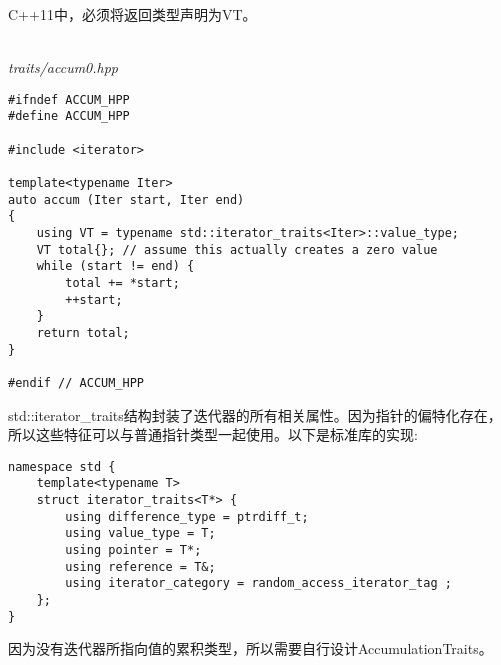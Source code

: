 \begin{tcolorbox}[colback=webgreen!5!white,colframe=webgreen!75!black]
\hspace*{0.75cm}C++11中，必须将返回类型声明为VT。
\end{tcolorbox}

\hspace*{\fill} \\ %
\noindent
\textit{traits/accum0.hpp}
\begin{lstlisting}[style=styleCXX]
#ifndef ACCUM_HPP
#define ACCUM_HPP

#include <iterator>

template<typename Iter>
auto accum (Iter start, Iter end)
{
	using VT = typename std::iterator_traits<Iter>::value_type;
	VT total{}; // assume this actually creates a zero value
	while (start != end) {
		total += *start;
		++start;
	}
	return total;
}

#endif // ACCUM_HPP
\end{lstlisting}

std::iterator\_traits结构封装了迭代器的所有相关属性。因为指针的偏特化存在，所以这些特征可以与普通指针类型一起使用。以下是标准库的实现:

\begin{lstlisting}[style=styleCXX]
namespace std {
	template<typename T>
	struct iterator_traits<T*> {
		using difference_type = ptrdiff_t;
		using value_type = T;
		using pointer = T*;
		using reference = T&;
		using iterator_category = random_access_iterator_tag ;
	};
}
\end{lstlisting}

因为没有迭代器所指向值的累积类型，所以需要自行设计AccumulationTraits。









